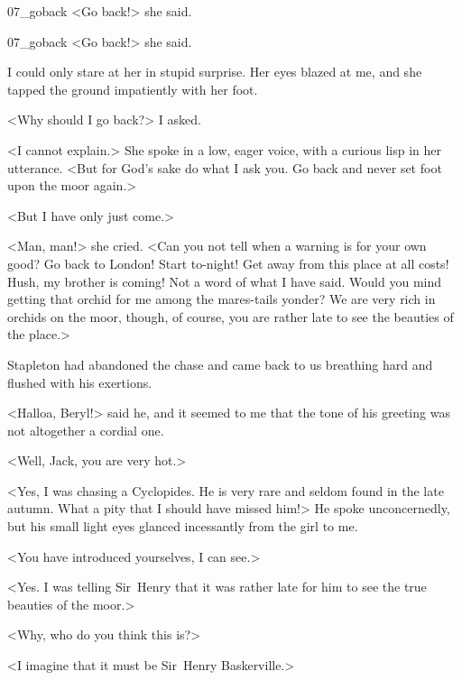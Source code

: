 \begin{a4}
	\begin{bwbigpic}
			[1.0]  
		{07_goback}
		{<Go back!> she said.}
	\end{bwbigpic}
\end{a4}

\begin{letter}
	\begin{bwbigpic}
			[1.0]  
		{07_goback}
		{<Go back!> she said.}
	\end{bwbigpic}
\end{letter}

I could only stare at her in stupid surprise. Her eyes blazed at me, and she tapped the ground impatiently with her foot.

<Why should I go back?> I asked.

<I cannot explain.> She spoke in a low, eager voice, with a curious lisp in her utterance. <But for God's sake do what I ask you. Go back and never set foot upon the moor again.>

<But I have only just come.>

<Man, man!> she cried. <Can you not tell when a warning is for your own good? Go back to London! Start to-night! Get away from this place at all costs! Hush, my brother is coming! Not a word of what I have said. Would you mind getting that orchid for me among the mares-tails yonder? We are very rich in orchids on the moor, though, of course, you are rather late to see the beauties of the place.>

Stapleton had abandoned the chase and came back to us breathing hard and flushed with his exertions.

<Halloa, Beryl!> said he, and it seemed to me that the tone of his greeting was not altogether a cordial one.

<Well, Jack, you are very hot.>

<Yes, I was chasing a Cyclopides. He is very rare and seldom found in the late autumn. What a pity that I should have missed him!> He spoke unconcernedly, but his small light eyes glanced incessantly from the girl to me.

<You have introduced yourselves, I can see.>

<Yes. I was telling Sir~Henry that it was rather late for him to see the true beauties of the moor.>

<Why, who do you think this is?>

<I imagine that it must be Sir~Henry Baskerville.>

